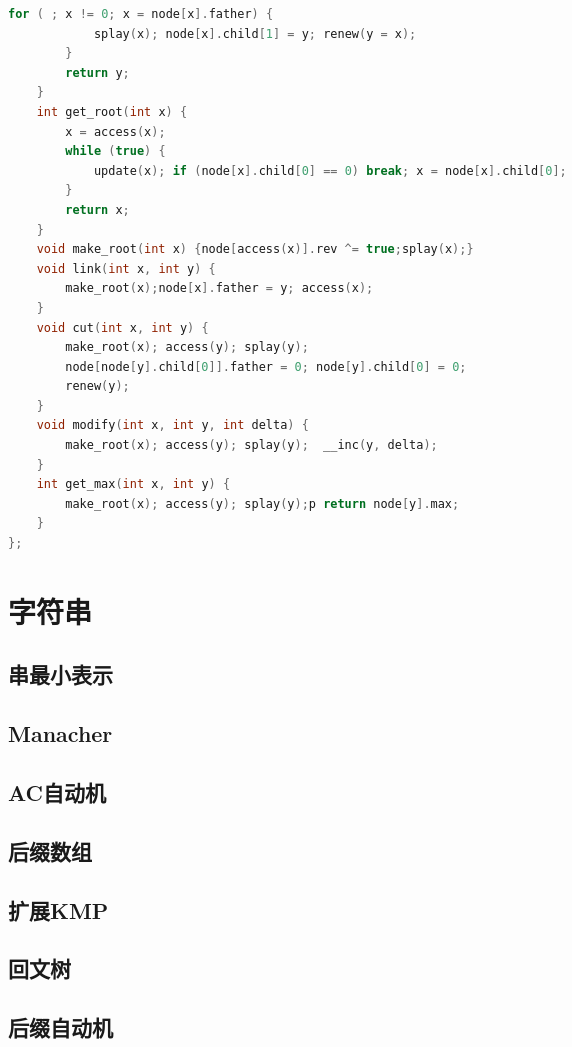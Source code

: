 \documentclass[landscape,a4paper]{article}
\begin{document}
\begin{spacing}{0.3}
\begin{multicols}{3}
\begin{lstlisting}[language=C++]
        for ( ; x != 0; x = node[x].father) {
            splay(x); node[x].child[1] = y; renew(y = x);
        }
        return y;
    }
    int get_root(int x) {
        x = access(x);
        while (true) {
            update(x); if (node[x].child[0] == 0) break; x = node[x].child[0];
        }
        return x;
    }
    void make_root(int x) {node[access(x)].rev ^= true;splay(x);}
    void link(int x, int y) {
        make_root(x);node[x].father = y; access(x);
    }
    void cut(int x, int y) {
        make_root(x); access(y); splay(y);
        node[node[y].child[0]].father = 0; node[y].child[0] = 0;
        renew(y);
    }
    void modify(int x, int y, int delta) {
        make_root(x); access(y); splay(y);  __inc(y, delta);
    }
    int get_max(int x, int y) {
        make_root(x); access(y); splay(y);p return node[y].max;
    }
};
\end{lstlisting}

	\section{字符串}
		\subsection{串最小表示}
		
		\subsection{Manacher}
		
		\subsection{AC自动机}
		
		\subsection{后缀数组}
		
		\subsection{扩展KMP}
		
		\subsection{回文树}
		
		\subsection{后缀自动机}
		

\end{multicols}
\end{spacing}
\end{document}
